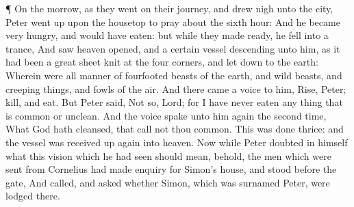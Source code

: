  ¶ On the morrow, as they went on their journey, and drew
nigh unto the city, Peter went up upon the housetop to pray about the
sixth hour:  And he became very hungry, and would have
eaten: but while they made ready, he fell into a trance, 
And saw heaven opened, and a certain vessel descending unto him, as it
had been a great sheet knit at the four corners, and let down to the
earth:  Wherein were all manner of fourfooted beasts of the
earth, and wild beasts, and creeping things, and fowls of the air.
 And there came a voice to him, Rise, Peter; kill, and eat.
 But Peter said, Not so, Lord; for I have never eaten any
thing that is common or unclean.  And the voice spake unto
him again the second time, What God hath cleansed, that call not thou
common.  This was done thrice: and the vessel was received
up again into heaven.  Now while Peter doubted in himself
what this vision which he had seen should mean, behold, the men which
were sent from Cornelius had made enquiry for Simon's house, and stood
before the gate,  And called, and asked whether Simon,
which was surnamed Peter, were lodged there.


